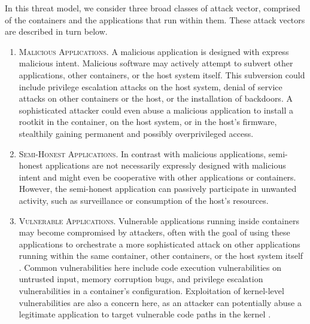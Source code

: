 In this threat model, we consider three broad classes of attack vector, comprised of the containers and the applications that run within them. These attack vectors are described in turn below.
\begin{enumerate}[label=\bfseries AV\arabic*., ref=AV\arabic*, labelindent=1em]
  \item \textsc{Malicious Applications.}
    A malicious application is designed with express malicious intent. Malicious software may actively attempt to subvert other applications, other containers, or the host system itself. This subversion could include privilege escalation attacks on the host system, denial of service attacks on other containers or the host, or the installation of backdoors. A sophisticated attacker could even abuse a malicious application to install a rootkit \cite{beegle2007_rootkit} in the container, on the host system, or in the host's firmware, stealthily gaining permanent and possibly overprivileged access.

  \item \textsc{Semi-Honest Applications.}
    In contrast with malicious applications, semi-honest applications are not necessarily expressly designed with malicious intent and might even be cooperative with other applications or containers. However, the semi-honest application can passively participate in unwanted activity, such as surveillance or consumption of the host's resources.

  \item \textsc{Vulnerable Applications.}
    Vulnerable applications running inside containers may become compromised by attackers, often with the goal of using these applications to orchestrate a more sophisticated attack on other applications running within the same container, other containers, or the host system itself \cite{sultan2019_container_security}. Common vulnerabilities here include code execution vulnerabilities on untrusted input, memory corruption bugs, and privilege escalation vulnerabilities in a container's configuration. Exploitation of kernel-level vulnerabilities are also a concern here, as an attacker can potentially abuse a legitimate application to target vulnerable code paths in the kernel \cite{xin2018_container_security}.
\end{enumerate}

